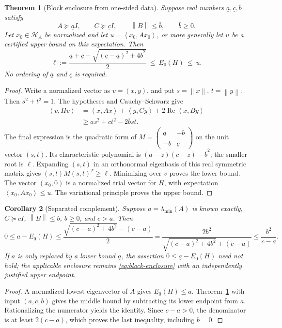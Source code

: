 \documentclass[11pt,a4paper]{article}
\theoremstyle{plain}
\newtheorem{theorem}{Theorem}[section]
\newtheorem{corollary}[theorem]{Corollary}
\theoremstyle{definition}
\theoremstyle{remark}
\newcommand{\norm}[1]{\left\lVert #1\right\rVert}
\newcommand{\ip}[2]{\left\langle #1,#2\right\rangle}
\begin{document}
\begin{theorem}[Block enclosure from one-sided data]
\label{thm:block}
Suppose real numbers $\underline a,\underline c,\overline b$ satisfy
\[
 A\succeq\underline a I,\qquad C\succeq\underline c I,
 \qquad \norm B\le\overline b,\qquad \overline b\ge0.
\]
Let $x_0\in\mathcal H_A$ be normalized and let
$u=\ip{x_0}{Ax_0}$, or more generally let $u$ be a certified upper bound
on this expectation. Then
\begin{equation}
 \ell:=\frac{\underline a+\underline c
       -\sqrt{(\underline c-\underline a)^2+4\overline b^2}}2
 \ \le\ E_0(H)\ \le\ u.
 \label{eq:block-enclosure}
\end{equation}
No ordering of $\underline a$ and $\underline c$ is required.
\end{theorem}
\begin{proof}
Write a normalized vector as $v=(x,y)$, and put
$s=\norm x$, $t=\norm y$. Then $s^2+t^2=1$. The hypotheses and
Cauchy--Schwarz give
\begin{align*}
 \ip{v}{Hv}
 &=\ip{x}{Ax}+\ip{y}{Cy}+2\operatorname{Re}\ip{x}{By}\\
 &\ge\underline a s^2+\underline c t^2-2\overline b st.
\end{align*}
The final expression is the quadratic form of
$M=\left(\begin{smallmatrix}\underline a&-\overline b\\
-\overline b&\underline c\end{smallmatrix}\right)$
on the unit vector $(s,t)$. Its characteristic polynomial is
$(\underline a-z)(\underline c-z)-\overline b^2$; the smaller root is
$\ell$. Expanding $(s,t)$ in an orthonormal eigenbasis of this real
symmetric matrix gives $(s,t)M(s,t)^T\ge\ell$. Minimizing over $v$
proves the lower bound. The vector $(x_0,0)$ is a normalized trial vector
for $H$, with expectation $\ip{x_0}{Ax_0}\le u$. The variational
principle proves the upper bound.
\end{proof}

\begin{corollary}[Separated complement]
\label{cor:gap}
Suppose $a=\lambda_{\min}(A)$ is known exactly,
$C\succeq cI$, $\norm B\le b$, $b\ge0$, and $c>a$. Then
\begin{equation}
 0\le a-E_0(H)
 \le\frac{\sqrt{(c-a)^2+4b^2}-(c-a)}2
 =\frac{2b^2}{\sqrt{(c-a)^2+4b^2}+(c-a)}
 \le\frac{b^2}{c-a}.
 \label{eq:gap-bound}
\end{equation}
If $a$ is only replaced by a lower bound $\underline a$, the assertion
$0\le\underline a-E_0(H)$ need not hold; the applicable enclosure remains
\eqref{eq:block-enclosure} with an independently justified upper endpoint.
\end{corollary}
\begin{proof}
A normalized lowest eigenvector of $A$ gives $E_0(H)\le a$.
Theorem~\ref{thm:block} with input $(a,c,b)$ gives the middle bound by
subtracting its lower endpoint from $a$. Rationalizing the numerator yields
the identity. Since $c-a>0$, the denominator is at least $2(c-a)$,
which proves the last inequality, including $b=0$.
\end{proof}
\end{document}
